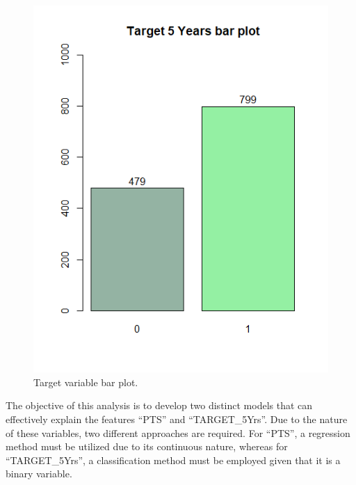 \begin{figure}[H]
	\centering
	\includegraphics[width=0.5\linewidth]{ImageFiles/Histograms/target_bar_plot}
	\caption{Target variable bar plot.}
	\label{fig:target_bar_plot}
\end{figure}

The objective of this analysis is to develop two distinct models that can effectively explain the features ``PTS'' and ``TARGET\_5Yrs''. Due to the nature of these variables, two different approaches are required. For ``PTS'', a regression method must be utilized due to its continuous nature, whereas for ``TARGET\_5Yrs'', a classification method must be employed given that it is a binary variable.